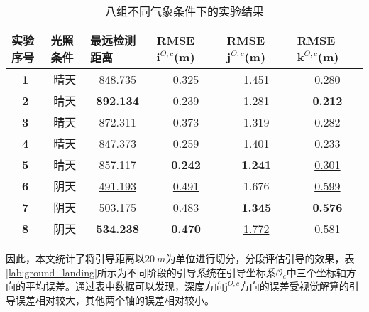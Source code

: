\begin{table}[]
	\centering
	\caption{八组不同气象条件下的实验结果}
	\label{lab:eight_ground_landing}
	\begin{tabular}{cccccc}
		\hline
		\multicolumn{1}{l}{\textbf{实验序号}} & \multicolumn{1}{l}{\textbf{光照条件}} & \multicolumn{1}{l}{\textbf{最远检测距离}} & \multicolumn{1}{l}{\textbf{RMSE $\mathbf{i}^{O,c}$(m)}} & \multicolumn{1}{l}{\textbf{RMSE $\mathbf{j}^{O,c}$(m)}} & \multicolumn{1}{l}{\textbf{RMSE $\mathbf{k}^{O,c}$(m)}} \\ \hline
		\textbf{1} & 晴天 & 848.735 & \underline{0.325} & \underline{1.451} & 0.280 \\
		\textbf{2} & 晴天 & \textbf{892.134} & 0.239 & 1.281 & \textbf{0.212} \\
		\textbf{3} & 晴天 & 872.311 & 0.373 & 1.319 & 0.282 \\
		\textbf{4} & 晴天 & \underline{847.373} & 0.259 & 1.401 & 0.233 \\
		\textbf{5} & 晴天 & 857.117 & \textbf{0.242} & \textbf{1.241} & \underline{0.301} \\ \hline
		\textbf{6} & 阴天 & \underline{491.193} & \underline{0.491} & 1.676 & \underline{0.599} \\
		\textbf{7} & 阴天 & 503.175 & 0.483 & \textbf{1.345} & \textbf{0.576} \\
		\textbf{8} & 阴天 & \textbf{534.238} & \textbf{0.470} & \underline{1.772} & 0.581 \\ \hline
	\end{tabular}
\end{table}

因此，本文统计了将引导距离以$20\ m$为单位进行切分，分段评估引导的效果，表\ref{lab:ground_landing}所示为不同阶段的引导系统在引导坐标系$\mathcal{O}_c$中三个坐标轴方向的平均误差。通过表中数据可以发现，深度方向$\mathbf{j}^{O,c}$方向的误差受视觉解算的引导误差相对较大，其他两个轴的误差相对较小。


